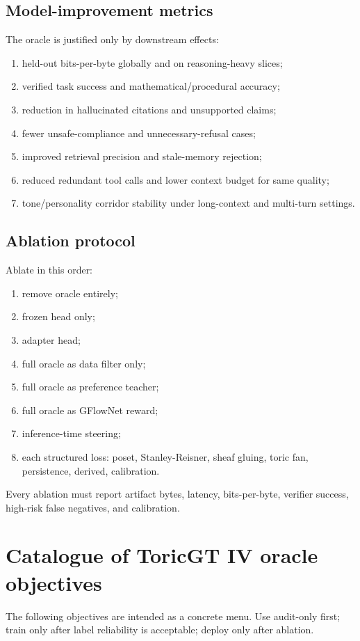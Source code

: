 \documentclass[11pt]{article}
\numberwithin{equation}{section}
\begin{document}
\subsection{Model-improvement metrics}
The oracle is justified only by downstream effects:
\begin{enumerate}
\item held-out bits-per-byte globally and on reasoning-heavy slices;
\item verified task success and mathematical/procedural accuracy;
\item reduction in hallucinated citations and unsupported claims;
\item fewer unsafe-compliance and unnecessary-refusal cases;
\item improved retrieval precision and stale-memory rejection;
\item reduced redundant tool calls and lower context budget for same quality;
\item tone/personality corridor stability under long-context and multi-turn settings.
\end{enumerate}

\subsection{Ablation protocol}
Ablate in this order:
\begin{enumerate}
\item remove oracle entirely;
\item frozen head only;
\item adapter head;
\item full oracle as data filter only;
\item full oracle as preference teacher;
\item full oracle as GFlowNet reward;
\item inference-time steering;
\item each structured loss: poset, Stanley-Reisner, sheaf gluing, toric fan, persistence, derived, calibration.
\end{enumerate}
Every ablation must report artifact bytes, latency, bits-per-byte, verifier success, high-risk false negatives, and calibration.

\section{Catalogue of ToricGT IV oracle objectives}
The following objectives are intended as a concrete menu. Use audit-only first; train only after label reliability is acceptable; deploy only after ablation.
\end{document}
